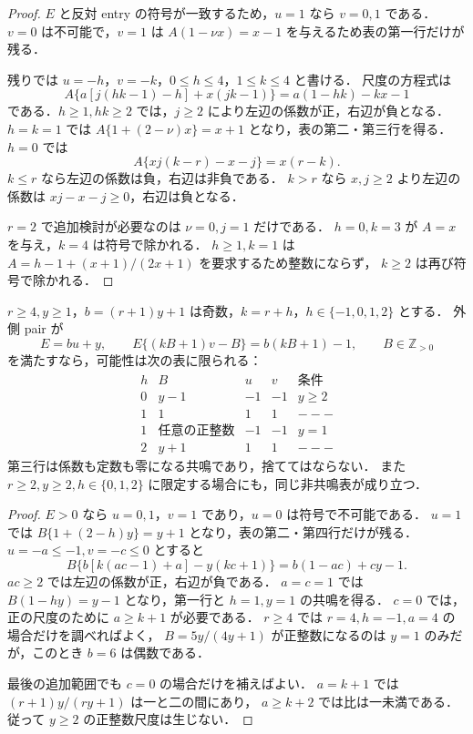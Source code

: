 \begin{proof}
$E$ と反対 entry の符号が一致するため，$u=1$ なら $v=0,1$ である．
$v=0$ は不可能で，$v=1$ は
$A(1-\nu x)=x-1$ を与えるため表の第一行だけが残る．

残りでは $u=-h$，$v=-k$，$0\le h\le4$，$1\le k\le4$ と書ける．
尺度の方程式は
\[
 A\{a[j(hk-1)-h]+x(jk-1)\}=a(1-hk)-kx-1
\]
である．$h\ge1,hk\ge2$ では，$j\ge2$ により左辺の係数が正，右辺が負となる．
$h=k=1$ では
$A\{1+(2-\nu)x\}=x+1$ となり，表の第二・第三行を得る．
$h=0$ では
\[
 A\{xj(k-r)-x-j\}=x(r-k).
\]
$k\le r$ なら左辺の係数は負，右辺は非負である．
$k>r$ なら $x,j\ge2$ より左辺の係数は
$xj-x-j\ge0$，右辺は負となる．

$r=2$ で追加検討が必要なのは $\nu=0,j=1$ だけである．
$h=0,k=3$ が $A=x$ を与え，$k=4$ は符号で除かれる．
$h\ge1,k=1$ は
$A=h-1+(x+1)/(2x+1)$ を要求するため整数にならず，
$k\ge2$ は再び符号で除かれる．
\end{proof}

\begin{lemma}
\label{ne23:negative-transfer}
$r\ge4,y\ge1$，$b=(r+1)y+1$ は奇数，$k=r+h$，$h\in\{-1,0,1,2\}$ とする．
外側 pair が
\[
 E=bu+y,\qquad
 E\{(kB+1)v-B\}=b(kB+1)-1,\qquad B\in\mathbb Z_{>0}
\]
を満たすなら，可能性は次の表に限られる：
\[
\begin{array}{c|c|c|c|l}
h&B&u&v&条件\\\hline
0&y-1&-1&-1&y\ge2\\
1&1&1&1&---\\
1&\text{任意の正整数}&-1&-1&y=1\\
2&y+1&1&1&---
\end{array}
\]
第三行は係数も定数も零になる共鳴であり，捨ててはならない．
また $r\ge2,y\ge2,h\in\{0,1,2\}$ に限定する場合にも，同じ非共鳴表が成り立つ．
\end{lemma}

\begin{proof}
$E>0$ なら $u=0,1$，$v=1$ であり，$u=0$ は符号で不可能である．
$u=1$ では
$B\{1+(2-h)y\}=y+1$ となり，表の第二・第四行だけが残る．
$u=-a\le-1,v=-c\le0$ とすると
\[
 B\{b[k(ac-1)+a]-y(kc+1)\}=b(1-ac)+cy-1.
\]
$ac\ge2$ では左辺の係数が正，右辺が負である．
$a=c=1$ では $B(1-hy)=y-1$ となり，第一行と $h=1,y=1$ の共鳴を得る．
$c=0$ では，正の尺度のために $a\ge k+1$ が必要である．
$r\ge4$ では $r=4,h=-1,a=4$ の場合だけを調べればよく，
$B=5y/(4y+1)$ が正整数になるのは $y=1$ のみだが，このとき $b=6$ は偶数である．

最後の追加範囲でも $c=0$ の場合だけを補えばよい．
$a=k+1$ では $(r+1)y/(ry+1)$ は一と二の間にあり，
$a\ge k+2$ では比は一未満である．従って $y\ge2$ の正整数尺度は生じない．
\end{proof}

